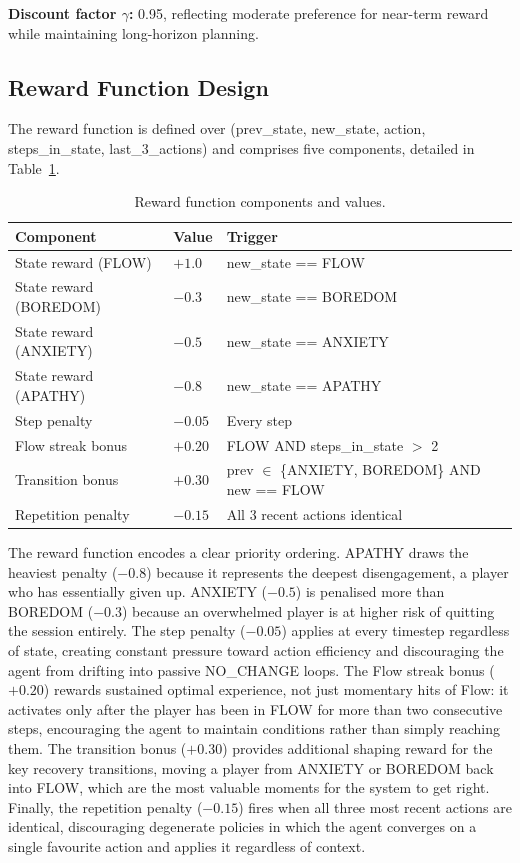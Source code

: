 \textbf{Discount factor $\gamma$:} 0.95, reflecting moderate preference for near-term reward while maintaining long-horizon planning.

\subsection{Reward Function Design}

The reward function is defined over (prev\_state, new\_state, action, steps\_in\_state, last\_3\_actions) and comprises five components, detailed in Table~\ref{tab:reward}.

\begin{table}[H]
\centering
\caption{Reward function components and values.}
\label{tab:reward}
\small
\begin{tabular}{@{}lll@{}}
\toprule
\textbf{Component} & \textbf{Value} & \textbf{Trigger} \\
\midrule
State reward (FLOW) & $+1.0$ & new\_state == FLOW \\
State reward (BOREDOM) & $-0.3$ & new\_state == BOREDOM \\
State reward (ANXIETY) & $-0.5$ & new\_state == ANXIETY \\
State reward (APATHY) & $-0.8$ & new\_state == APATHY \\
Step penalty & $-0.05$ & Every step \\
Flow streak bonus & $+0.20$ & FLOW AND steps\_in\_state $>$ 2 \\
Transition bonus & $+0.30$ & prev $\in$ \{ANXIETY, BOREDOM\} AND new == FLOW \\
Repetition penalty & $-0.15$ & All 3 recent actions identical \\
\bottomrule
\end{tabular}
\end{table}

The reward function encodes a clear priority ordering. APATHY draws the heaviest penalty ($-0.8$) because it represents the deepest disengagement, a player who has essentially given up. ANXIETY ($-0.5$) is penalised more than BOREDOM ($-0.3$) because an overwhelmed player is at higher risk of quitting the session entirely. The step penalty ($-0.05$) applies at every timestep regardless of state, creating constant pressure toward action efficiency and discouraging the agent from drifting into passive NO\_CHANGE loops. The Flow streak bonus ($+0.20$) rewards sustained optimal experience, not just momentary hits of Flow: it activates only after the player has been in FLOW for more than two consecutive steps, encouraging the agent to maintain conditions rather than simply reaching them. The transition bonus ($+0.30$) provides additional shaping reward for the key recovery transitions, moving a player from ANXIETY or BOREDOM back into FLOW, which are the most valuable moments for the system to get right. Finally, the repetition penalty ($-0.15$) fires when all three most recent actions are identical, discouraging degenerate policies in which the agent converges on a single favourite action and applies it regardless of context.

